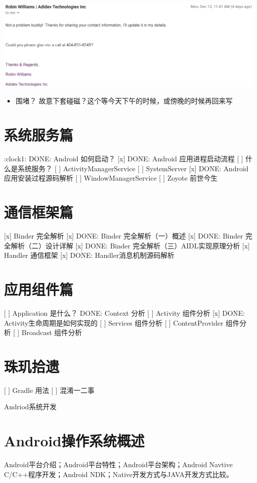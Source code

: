 \documentclass[9pt, b5paper]{article}
\begin{document}
\includegraphics[width=.9\linewidth]{./pic/buddy.png}

\begin{itemize}
\item 围堵？ 故意下套碰磁？这个等今天下午的时候，或傍晚的时候再回来写
\end{itemize}

\section{系统服务篇}
\label{sec-3}
:clock1: DONE: Android 如何启动？
[x] DONE: Android 应用进程启动流程
[ ] 什么是系统服务？
[ ] ActivityManagerService
[ ] SystemServer
[x] DONE: Android 应用安装过程源码解析
[ ] WindowManagerService
[ ] Zoyote 前世今生

\section{通信框架篇}
\label{sec-4}
[x] Binder 完全解析
[x] DONE: Binder 完全解析（一）概述
[x] DONE: Binder 完全解析（二）设计详解
[x] DONE: Binder 完全解析（三）AIDL实现原理分析
[x] Handler 通信框架
[x] DONE: Handler消息机制源码解析

\section{应用组件篇}
\label{sec-5}
[ ] Application 是什么？
DONE: Context 分析
[ ] Activity 组件分析
[x] DONE: Activity生命周期是如何实现的
[ ] Services 组件分析
[ ] ContentProvider 组件分析
[ ] Broadcast 组件分析

\section{珠玑拾遗}
\label{sec-6}
[ ] Gradle 用法
[ ] 混淆一二事

Andriod系统开发

\section{Android操作系统概述}
\label{sec-7}
Android平台介绍；Android平台特性；Android平台架构；Android Navtive C/C++程序开发；Android NDK；Native开发方式与JAVA开发方式比较。
\end{document}
